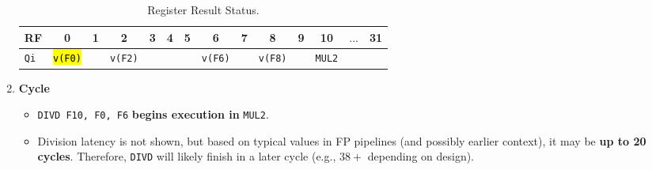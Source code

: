 \begin{enumerate}
    \begin{table}[!htp]
        \centering
        \begin{adjustbox}{width={\textwidth},totalheight={\textheight},keepaspectratio}
            \begin{tabular}{@{} l | c c c c c c c c c c c c c @{}}
                \toprule
                RF              & 0                     & 1             & 2                     & 3             & 4             & 5             & 6                     & 7             & 8                     & 9             & 10                    & $\dots$           & 31            \\
                \midrule
                \texttt{Qi}     & \hl{\texttt{v(F0)}}   &               & \texttt{v(F2)}        &               &               &               & \texttt{v(F6)}        &               & \texttt{v(F8)}        &               & \texttt{MUL2}         &                   &               \\
                \bottomrule
            \end{tabular}   
        \end{adjustbox}
        \caption*{Register Result Status.}
    \end{table}

    \newpage


    \item \textbf{Cycle \theenumi}
    \begin{itemize}
        \item \texttt{DIVD F10, F0, F6} \textbf{begins execution in} \texttt{MUL2}.
        \item Division latency is not shown, but based on typical values in FP pipelines (and possibly earlier context), it may be \textbf{up to 20 cycles}. Therefore, \texttt{DIVD} will likely finish in a later cycle (e.g., $38+$ depending on design).
    \end{itemize}


\end{enumerate}
